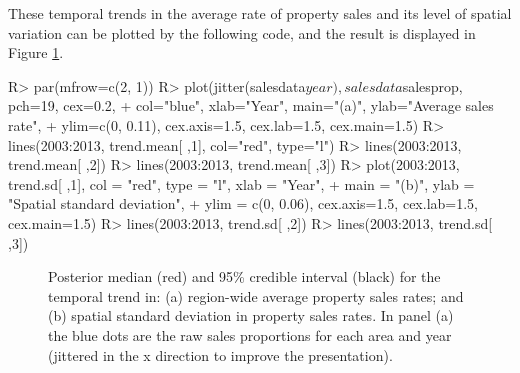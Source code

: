 \documentclass[article, nojss]{jss}
\begin{document}
These temporal trends in the average rate of property sales and its level of spatial variation can be plotted by the following code, and the result is displayed in Figure \ref{salestrend}.



\begin{CodeInput}
R>  par(mfrow=c(2, 1))
R>  plot(jitter(salesdata$year), salesdata$salesprop, pch=19, cex=0.2, 
+       col="blue", xlab="Year", main="(a)", ylab="Average sales rate", 
+       ylim=c(0, 0.11), cex.axis=1.5, cex.lab=1.5, cex.main=1.5)
R>  lines(2003:2013, trend.mean[ ,1], col="red", type="l")
R>  lines(2003:2013, trend.mean[ ,2])
R>  lines(2003:2013, trend.mean[ ,3])
R>  plot(2003:2013, trend.sd[ ,1], col = "red", type = "l", xlab = "Year", 
+       main = "(b)", ylab = "Spatial standard deviation", 
+       ylim = c(0, 0.06), cex.axis=1.5, cex.lab=1.5, cex.main=1.5)
R>  lines(2003:2013, trend.sd[ ,2])
R>  lines(2003:2013, trend.sd[ ,3])
\end{CodeInput}



\begin{figure}
\centering 
{}
\caption{Posterior median (red) and 95\% credible interval (black) for the temporal trend in: (a) region-wide average property sales rates; and (b) spatial standard deviation in property sales rates. In panel (a) the blue dots are the raw sales proportions for each area and year (jittered in the x direction to improve the presentation).\label{salestrend}}
\end{figure} 
\end{document}
